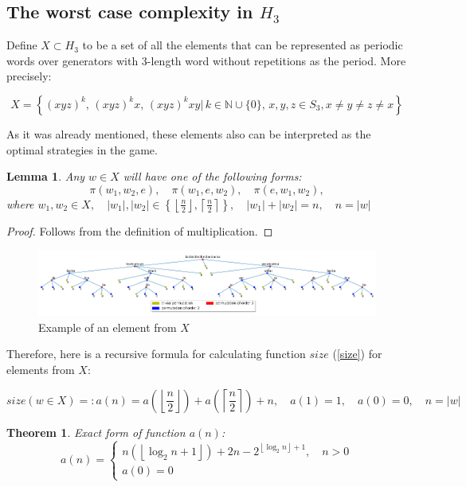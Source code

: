 \documentclass[a4paper,12pt]{amsart}
\newtheorem{theorem}{Theorem}
\newtheorem{lemma}{Lemma}
\begin{document}
\subsection{The worst case complexity in $H_3$}


Define $X \subset H_3$ to be a set of all the elements that can be represented as periodic words over generators with 3-length word without repetitions as the period. More precisely: 

\begin{equation}
X = \left\{ (xyz)^k, \, (xyz)^k x, \, (xyz)^k xy  |\, k \in \mathbb{N}\cup\{0\}, \, x,y,z \in S_3, x \ne y \ne z \ne x   \right\}
\end{equation}

As it was already mentioned, these elements also can be interpreted as the optimal strategies in the game.

\begin{lemma}
	Any $w \in X$ will have one of the following forms:
	$$\pi (w_1, w_2, e), \quad \pi(w_1, e, w_2), \quad \pi(e, w_1, w_2), $$
	where $w_1, w_2 \in X, \quad |w_1|, |w_2| \in
	\left\{
	\left\lfloor
	\frac{n}{2}
	\right\rfloor,
	\left\lceil
	\frac{n}{2}
	\right\rceil
	\right\}, \quad |w_1| + |w_2| = n, \quad n = |w|$
	\\
\end{lemma}

\begin{proof}
	Follows from the definition of multiplication.
\end{proof}


\begin{figure}[h]
	\includegraphics[scale=0.5]{../graphs/max_size_tree.png}
	\caption{Example of an element from $X$}
\end{figure}


Therefore, here is a recursive formula for calculating function $size$ (\ref{size}) for elements from $X$:

$$size(w \in X) =: a (n) = a \left(
\left\lfloor
\frac{n}{2}
\right\rfloor
\right)
+ a \left(
\left\lceil
\frac{n}{2}
\right\rceil
\right) + n, \quad a(1) = 1, \quad a(0) = 0, \quad n = |w|
$$

\begin{theorem}
	Exact form of function $a(n)$:
	\begin{equation}
	a(n) = \begin{cases}
	n \left(\left\lfloor \log_2 n + 1 \right\rfloor\right) + 2n - 2^{\left\lfloor\log_2 n\right\rfloor + 1}, \quad n > 0 \\
	a(0) = 0
	\end{cases}
	\end{equation}
\end{theorem}
\end{document}
